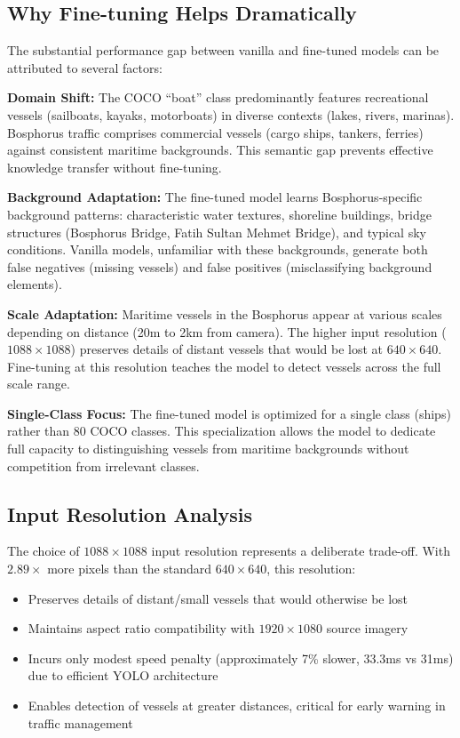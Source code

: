 \documentclass[pdflatex,sn-mathphys-num,Numbered]{sn-jnl}
\begin{document}
\subsection{Why Fine-tuning Helps Dramatically}\label{subsec:why-finetuning}

The substantial performance gap between vanilla and fine-tuned models can be attributed to several factors:

\textbf{Domain Shift:} The COCO ``boat'' class predominantly features recreational vessels (sailboats, kayaks, motorboats) in diverse contexts (lakes, rivers, marinas). Bosphorus traffic comprises commercial vessels (cargo ships, tankers, ferries) against consistent maritime backgrounds. This semantic gap prevents effective knowledge transfer without fine-tuning.

\textbf{Background Adaptation:} The fine-tuned model learns Bosphorus-specific background patterns: characteristic water textures, shoreline buildings, bridge structures (Bosphorus Bridge, Fatih Sultan Mehmet Bridge), and typical sky conditions. Vanilla models, unfamiliar with these backgrounds, generate both false negatives (missing vessels) and false positives (misclassifying background elements).

\textbf{Scale Adaptation:} Maritime vessels in the Bosphorus appear at various scales depending on distance (20m to 2km from camera). The higher input resolution ($1088 \times 1088$) preserves details of distant vessels that would be lost at $640 \times 640$. Fine-tuning at this resolution teaches the model to detect vessels across the full scale range.

\textbf{Single-Class Focus:} The fine-tuned model is optimized for a single class (ships) rather than 80 COCO classes. This specialization allows the model to dedicate full capacity to distinguishing vessels from maritime backgrounds without competition from irrelevant classes.

\subsection{Input Resolution Analysis}\label{subsec:resolution-analysis}

The choice of $1088 \times 1088$ input resolution represents a deliberate trade-off. With $2.89\times$ more pixels than the standard $640 \times 640$, this resolution:

\begin{itemize}
    \item Preserves details of distant/small vessels that would otherwise be lost
    \item Maintains aspect ratio compatibility with $1920 \times 1080$ source imagery
    \item Incurs only modest speed penalty (approximately 7\% slower, 33.3ms vs 31ms) due to efficient YOLO architecture
    \item Enables detection of vessels at greater distances, critical for early warning in traffic management
\end{itemize}
\end{document}
